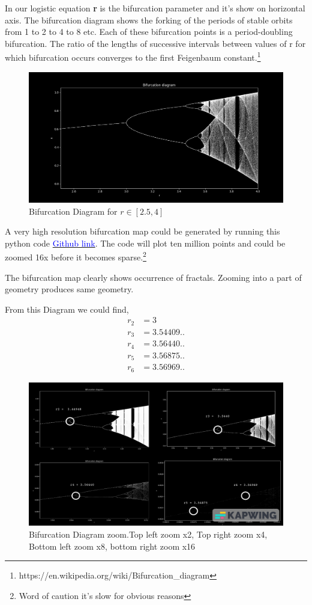 \documentclass{report}
\begin{document}
In our logistic equation \textbf{r} is the bifurcation parameter and it's show on horizontal axis. The bifurcation diagram shows the forking of the periods of stable orbits from 1 to 2 to 4 to 8 etc. Each of these bifurcation points is a period-doubling bifurcation. The ratio of the lengths of successive intervals between values of r for which bifurcation occurs converges to the first Feigenbaum constant.\footnote[2]{https://en.wikipedia.org/wiki/Bifurcation\_diagram}

\begin{figure}[!h]
    \centering
    \includegraphics[scale=.45]{images/BifurcationDiag.png}
    \caption{Bifurcation Diagram for $r \in [2.5,4]$}
    \label{fig:my_label4}
\end{figure}

A very high resolution bifurcation map could be generated by running this python code \href{https://github.com/notcamelcase01/ME5010Project/blob/master/high\_res\_bfmap.py}{\textcolor{blue}{Github link}}. The code will plot ten million points and could be zoomed 16x before it becomes sparse.\footnote[3]{Word of caution it's slow for obvious reasons}

The bifurcation map clearly shows occurrence of fractals. Zooming into a part of geometry produces same geometry.

From this Diagram we could find,
\begin{align}
    r_2 &= 3 \nonumber \\
    r_3 &= 3.54409.. \nonumber \\
    r_4 &= 3.56440.. \nonumber \\
    r_5 &= 3.56875.. \nonumber \\
    r_6 &= 3.56969.. \nonumber
\end{align}
\newpage

\begin{figure}[!h]
    \centering
    \includegraphics[scale=.35]{images/bfcol.png}
    \caption{Bifurcation Diagram zoom.Top left zoom x2, Top right zoom x4, Bottom left zoom x8, bottom right zoom x16}
    \label{fig:my_label5}
\end{figure}
\end{document}
